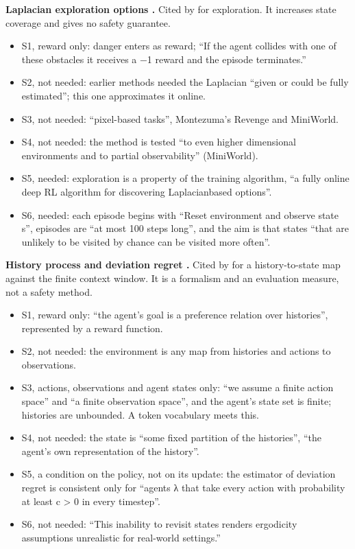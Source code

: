 \documentclass{article}
\providecommand{\tightlist}{\setlength{\itemsep}{0pt}\setlength{\parskip}{0pt}}
\begin{document}
\textbf{Laplacian exploration options \citep{klissarov2023}.} Cited by \citet{mclean2026} for exploration. It increases state coverage and gives no safety guarantee.

\begin{itemize}
\tightlist
\item
  S1, reward only: danger enters as reward; ``If the agent collides with one of these obstacles it receives a −1 reward and the episode terminates.''
\item
  S2, not needed: earlier methods needed the Laplacian ``given or could be fully estimated''; this one approximates it online.
\item
  S3, not needed: ``pixel-based tasks'', Montezuma's Revenge and MiniWorld.
\item
  S4, not needed: the method is tested ``to even higher dimensional environments and to partial observability'' (MiniWorld).
\item
  S5, needed: exploration is a property of the training algorithm, ``a fully online deep RL algorithm for discovering Laplacianbased options''.
\item
  S6, needed: each episode begins with ``Reset environment and observe state s'', episodes are ``at most 100 steps long'', and the aim is that states ``that are unlikely to be visited by chance can be visited more often''.
\end{itemize}

\textbf{History process and deviation regret \citep{elelimy2025}.} Cited by \citet{mclean2026} for a history-to-state map against the finite context window. It is a formalism and an evaluation measure, not a safety method.

\begin{itemize}
\tightlist
\item
  S1, reward only: ``the agent's goal is a preference relation over histories'', represented by a reward function.
\item
  S2, not needed: the environment is any map from histories and actions to observations.
\item
  S3, actions, observations and agent states only: ``we assume a finite action space'' and ``a finite observation space'', and the agent's state set is finite; histories are unbounded. A token vocabulary meets this.
\item
  S4, not needed: the state is ``some fixed partition of the histories'', ``the agent's own representation of the history''.
\item
  S5, a condition on the policy, not on its update: the estimator of deviation regret is consistent only for ``agents λ that take every action with probability at least c \textgreater{} 0 in every timestep''.
\item
  S6, not needed: ``This inability to revisit states renders ergodicity assumptions unrealistic for real-world settings.''
\end{itemize}
\end{document}
